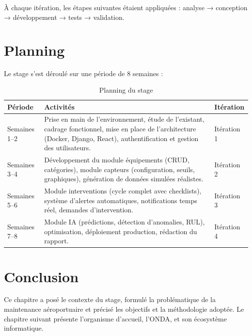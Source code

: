À chaque itération, les étapes suivantes étaient appliquées : analyse → conception → développement → tests → validation.

\section{Planning}
Le stage s'est déroulé sur une période de 8 semaines :

\begin{table}[H]
\centering
\renewcommand{\arraystretch}{1.3}
\begin{tabular}{@{}p{}p{}p{}@{}}
\hline
\textbf{Période} & \textbf{Activités} & \textbf{Itération} \\
\hline
Semaines 1--2 & Prise en main de l'environnement, étude de l'existant, cadrage fonctionnel, mise en place de l'architecture (Docker, Django, React), authentification et gestion des utilisateurs. & Itération 1 \\
\hline
Semaines 3--4 & Développement du module équipements (CRUD, catégories), module capteurs (configuration, seuils, graphiques), génération de données simulées réalistes. & Itération 2 \\
\hline
Semaines 5--6 & Module interventions (cycle complet avec checklists), système d'alertes automatiques, notifications temps réel, demandes d'intervention. & Itération 3 \\
\hline
Semaines 7--8 & Module IA (prédictions, détection d'anomalies, RUL), optimisation, déploiement production, rédaction du rapport. & Itération 4 \\
\hline
\end{tabular}
\caption{Planning du stage}
\end{table}

\section{Conclusion}
Ce chapitre a posé le contexte du stage, formulé la problématique de la maintenance aéroportuaire et précisé les objectifs et la méthodologie adoptée. Le chapitre suivant présente l'organisme d'accueil, l'ONDA, et son écosystème informatique.
